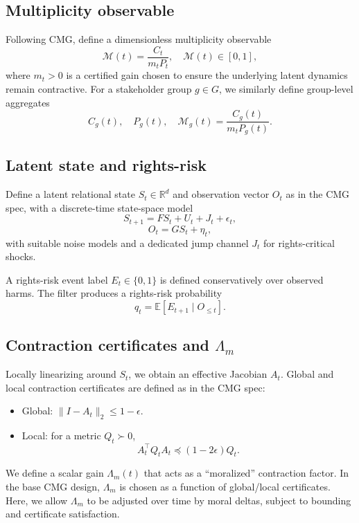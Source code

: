 \documentclass[11pt]{article}
\begin{document}
\subsection{Multiplicity observable}

Following CMG, define a dimensionless multiplicity observable
\[
\mathcal{M}(t) = \frac{C_t}{m_t P_t}, \quad \mathcal{M}(t) \in [0,1],
\]
where \(m_t>0\) is a certified gain chosen to ensure the underlying latent dynamics remain contractive.\cite{cmg-spec}
For a stakeholder group \(g \in G\), we similarly define group-level aggregates
\[
C_g(t), \quad P_g(t), \quad \mathcal{M}_g(t) = \frac{C_g(t)}{m_t P_g(t)}.
\]

\subsection{Latent state and rights-risk}

Define a latent relational state \(S_t \in \mathbb{R}^d\) and observation vector \(O_t\) as in the CMG spec, with a discrete-time state-space model
\[
S_{t+1} = F S_t + U_t + J_t + \epsilon_t,
\]
\[
O_t = G S_t + \eta_t,
\]
with suitable noise models and a dedicated jump channel \(J_t\) for rights-critical shocks.\cite{cmg-spec}

A rights-risk event label \(E_t \in \{0,1\}\) is defined conservatively over observed harms.
The filter produces a rights-risk probability
\[
q_t = \mathbb{E}[E_{t+1} \mid O_{\le t}].
\]

\subsection{Contraction certificates and \texorpdfstring{\(\Lambda_m\)}{Lambda\_m}}

Locally linearizing around \(S_t\), we obtain an effective Jacobian \(A_t\).
Global and local contraction certificates are defined as in the CMG spec:

\begin{itemize}[leftmargin=*]
  \item Global: \(\|I - A_t\|_2 \le 1 - \epsilon\).
  \item Local: for a metric \(Q_t \succ 0\),
  \[
  A_t^\top Q_t A_t \preceq (1-2\epsilon) Q_t.
  \]
\end{itemize}

We define a scalar gain \(\Lambda_m(t)\) that acts as a ``moralized'' contraction factor.
In the base CMG design, \(\Lambda_m\) is chosen as a function of global/local certificates.\cite{cmg-spec}
Here, we allow \(\Lambda_m\) to be adjusted over time by moral deltas, subject to bounding and certificate satisfaction.
\end{document}
